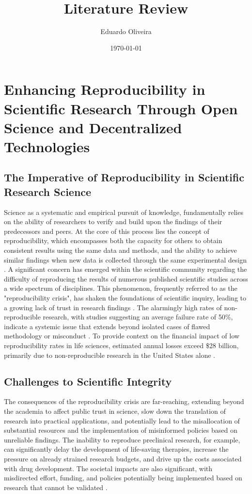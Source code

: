 \documentclass{article}
\title{Literature Review}
\author{Eduardo Oliveira}
\date{\today}
\begin{document}
\maketitle


\section{Enhancing Reproducibility in Scientific Research Through Open Science and Decentralized Technologies}

\subsection{The Imperative of Reproducibility in Scientific Research Science}

Science as a systematic and empirical pursuit of knowledge, fundamentally relies on the ability of researchers to verify and build upon the findings of their predecessors and peers. At the core of this process lies the concept of reproducibility, which encompasses both the capacity for others to obtain consistent results using the same data and methods, and the ability to achieve similar findings when new data is collected through the same experimental design \cite{pellizzari_reproducibility_2017, committee_2019}. A significant concern has emerged within the scientific community regarding the difficulty of reproducing the results of numerous published scientific studies across a wide spectrum of disciplines. This phenomenon, frequently referred to as the "reproducibility crisis", has shaken the foundations of scientific inquiry, leading to a growing lack of trust in research findings \cite{baker2016reproducibility}. The alarmingly high rates of non-reproducible research, with studies suggesting an average failure rate of 50\%, indicate a systemic issue that extends beyond isolated cases of flawed methodology or misconduct \cite{branch_reproducibility_2019}. To provide context on the financial impact of low reproducibility rates in life sciences, estimated annual losses exceed \$28 billion, primarily due to non-reproducible research in the United States alone \cite{freedman2015economics}.

\subsection{Challenges to Scientific Integrity}

The consequences of the reproducibility crisis are far-reaching, extending beyond the academia to affect public trust in science, slow down the translation of research into practical applications, and potentially lead to the misallocation of substantial resources and the implementation of misinformed policies based on unreliable findings. The inability to reproduce preclinical research, for example, can significantly delay the development of life-saving therapies, increase the pressure on already strained research budgets, and drive up the costs associated with drug development. The societal impacts are also significant, with misdirected effort, funding, and policies potentially being implemented based on research that cannot be validated \cite{freedman2015economics}.
\end{document}
